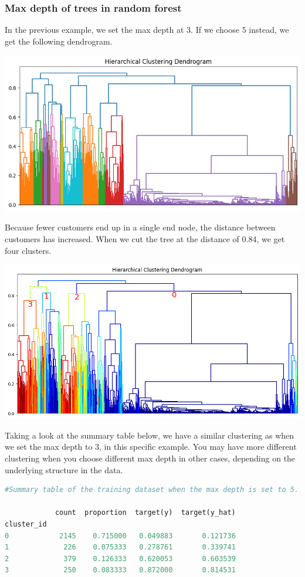 \documentclass{article}
\begin{document}
\subsubsection{Max depth of trees in random forest}
In the previous example, we set the max depth at 3. If we choose 5 instead, we get the following dendrogram.

\includegraphics[width=1\textwidth]{dendrogram_depth5}

Because fewer customers end up in a single end node, the distance between customers has increased. When we cut the tree at the distance of 0.84, we get four clusters.

\includegraphics[width=1\textwidth]{dendrogram_depth5_colored_thres084}

Taking a look at the summary table below, we have a similar clustering as when we set the max depth to 3, in this specific example. You may have more different clustering when you choose different max depth in other cases, depending on the underlying structure in the data. 

\begin{lstlisting}[language=Python,numbers=none] 
#Summary table of the training dataset when the max depth is set to 5.

            count  proportion  target(y)  target(y_hat)
cluster_id                                             
0            2145    0.715000   0.049883       0.121736
1             226    0.075333   0.278761       0.339741
2             379    0.126333   0.620053       0.603539
3             250    0.083333   0.872000       0.814531
\end{lstlisting}
\end{document}
